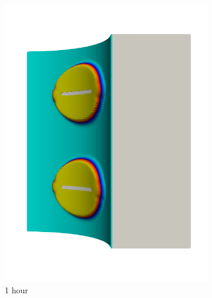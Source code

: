 \begin{figure}[!htb]
\begin{subfigure}[b]{0.2\textwidth}
    \includegraphics[width=\textwidth]{Chapter5/figures/spallation/seed_c_5}
    \caption{1 hour}
  \end{subfigure}
  \begin{subfigure}[b]{0.2\textwidth}
    \centering

\end{subfigure}
\end{figure}
